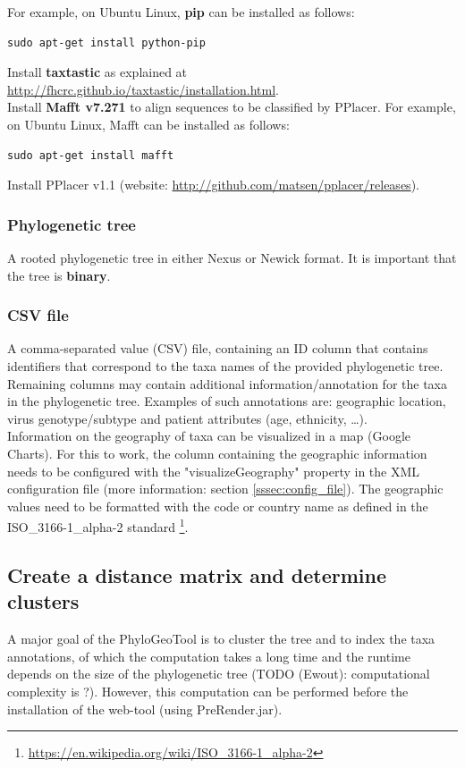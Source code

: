 \documentclass[a4paper, 11pt]{article} %
\begin{document}
\noindent For example, on Ubuntu Linux, \textbf{pip} can be installed as follows:
\begin{verbatim}
sudo apt-get install python-pip
\end{verbatim}

\noindent Install \textbf{taxtastic} as explained at \url{http://fhcrc.github.io/taxtastic/installation.html}.\\

\noindent Install \textbf{Mafft v7.271} to align sequences to be classified by PPlacer. 
For example, on Ubuntu Linux, Mafft can be installed as follows:
\begin{verbatim}
sudo apt-get install mafft
\end{verbatim}

\noindent Install PPlacer v1.1 (website: \url{http://github.com/matsen/pplacer/releases}).

\subsubsection*{Phylogenetic tree}
A rooted phylogenetic tree in either Nexus or Newick format. It is important that the tree is \textbf{binary}.

\subsubsection*{CSV file}
A comma-separated value (CSV) file, containing an ID column that contains identifiers that correspond to the taxa names of the provided phylogenetic tree.
Remaining columns may contain additional information/annotation for the taxa in the phylogenetic tree. 
Examples of such annotations are: geographic location, virus genotype/subtype and patient attributes (age, ethnicity, \ldots). \\
Information on the geography of taxa can be visualized in a map (Google Charts). 
For this to work, the column containing the geographic information needs to be configured with the "visualizeGeography" property in the XML configuration file (more information: section \ref{sssec:config_file}). 
The geographic values need to be formatted with the code or country name as defined in the ISO\_3166-1\_alpha-2 standard \footnote{\url{https://en.wikipedia.org/wiki/ISO\_3166-1\_alpha-2}}.

\subsection{Create a distance matrix and determine clusters}
A major goal of the PhyloGeoTool is to cluster the tree and to index the taxa annotations, of which the computation takes a long time and the runtime depends on the size of the phylogenetic tree (TODO (Ewout): computational complexity is ?). 
However, this computation can be performed before the installation of the web-tool (using PreRender.jar).
\end{document}
